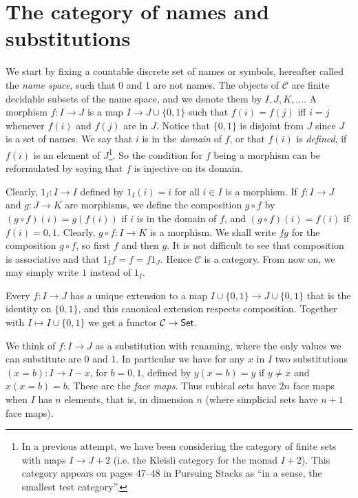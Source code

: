 \documentclass[10pt,a4paper]{article}
\newcommand{\CC}{{\mathcal C}}
\newcommand{\set}[1]{\{#1\}}
\begin{document}
\section{The category of names and substitutions}

 We start by fixing a countable discrete set of names or symbols, hereafter called the \emph{name space},
such that $0$ and $1$ are not names.
The objects of $\CC$ are finite decidable subsets of the name space,
and we denote them by $I,J,K,\dots$.
A morphism $f:I\to J$ is a map $I \to J\cup \set{0,1}$ such that $f(i) = f(j)$ if{f} $i=j$ whenever
$f(i)$ and $f(j)$ are in $J$. Notice that $\set{0,1}$ is disjoint from $J$ since $J$ is a set of
names. We say that $i$ is in the \emph{domain} of $f$, or that $f(i)$ is \emph{defined},
if $f(i)$ is an element of $J$\footnote%
{In a previous attempt, we have been considering the category of finite sets
with maps $I \to J+2$ (i.e. the Kleisli category for the monad $I+2$).
This category appears on pages 47--48 in Pursuing Stacks
\cite{Grothendieck} as ``in a sense, the smallest test category''.}.
So the condition for $f$ being a morphism can be reformulated by saying that $f$ is injective on its domain.

Clearly, $1_I : I\to I$ defined by $1_I(i) = i$ for all $i\in I$ is a morphism.
If $f:I\to J$ and $g:J\to K$ are morphisms, we define the composition $g\circ f$ by
$(g\circ f)(i) = g(f(i))$ if $i$ is in the domain of $f$, and $(g\circ f)(i) = f(i)$ if $f(i)= 0,1$.
Clearly, $g\circ f: I\to K$ is a morphism.
We shall write $fg$ for the composition $g\circ f$, so first $f$ and then $g$.
It is not difficult to see that composition is associative and that $1_I f = f = f 1_J$.
Hence $\CC$ is a category. From now on, we may simply write $1$ instead of $1_I$.

Every $f:I\to J$ has a unique extension to a map $I \cup \set{0,1} \to J\cup \set{0,1}$
that is the identity on $\set{0,1}$, and this canonical extension respects composition.
Together with $I\mapsto I \cup \set{0,1}$ we get a functor $\CC\to{\sf Set}$.

 We think of $f:I\to J$ as a substitution with renaming,
 where the only values we can substitute are $0$ and $1$.
In particular we have for any $x$ in $I$ two substitutions $(x=b):I\to I-x$, for $b=0,1$,
defined by $y(x=b) = y$ if $y\neq x$ and $x(x=b) = b$. These are the \emph{face maps}.
Thus cubical sets have $2n$ face maps when $I$ has $n$ elements, that is, in dimension $n$
(where simplicial sets have $n+1$ face maps).
\end{document}
